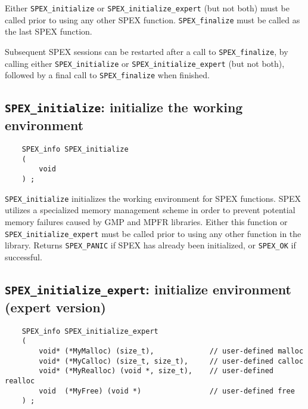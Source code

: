 \documentclass[12pt]{report}
\theoremstyle{definition}
\begin{document}
Either \verb|SPEX_initialize| or \verb|SPEX_initialize_expert| (but not both)
must be called prior to using any other SPEX function.  \verb|SPEX_finalize|
must be called as the last SPEX function.

Subsequent SPEX sessions can be restarted after a call to
\verb|SPEX_finalize|, by calling either \verb|SPEX_initialize| or
\verb|SPEX_initialize_expert| (but not both), followed by a final call to
\verb|SPEX_finalize| when finished.

\cprotect\subsection{\verb|SPEX_initialize|: initialize the working environment}

\begin{mdframed}[userdefinedwidth=6in]
{\footnotesize
\begin{verbatim}
    SPEX_info SPEX_initialize
    (
        void
    ) ;
\end{verbatim}
} \end{mdframed}

\verb|SPEX_initialize| initializes the working environment for SPEX
functions.  SPEX utilizes a specialized memory management scheme in order to
prevent potential memory failures caused by GMP and MPFR libraries.  Either
this function or \verb|SPEX_initialize_expert| must be called prior to using
any other function in the library.  Returns \verb|SPEX_PANIC| if SPEX has
already been initialized, or \verb|SPEX_OK| if successful.

\cprotect\subsection{\verb|SPEX_initialize_expert|: initialize environment
(expert version)}\label{ss:SPEX_initialize_expert}

\begin{mdframed}[userdefinedwidth=6in]
{\footnotesize
\begin{verbatim}
    SPEX_info SPEX_initialize_expert
    (
        void* (*MyMalloc) (size_t),             // user-defined malloc
        void* (*MyCalloc) (size_t, size_t),     // user-defined calloc
        void* (*MyRealloc) (void *, size_t),    // user-defined realloc
        void  (*MyFree) (void *)                // user-defined free
    ) ;
\end{verbatim}
} \end{mdframed}
\end{document}
